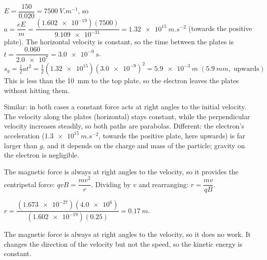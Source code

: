 \documentclass[12pt]{article}
\begin{document}
\ansq
{}
\begin{crit}
\end{crit}
\sample
$E = \dfrac{150}{0.020} = \qty{7500}{V.m^{-1}}$, so
$a = \dfrac{eE}{m} = \dfrac{(\num{1.602e-19})(7500)}{\num{9.109e-31}} = \qty{1.32e15}{m.s^{-2}}$ (towards the
positive plate). The horizontal velocity is constant, so the time between the plates is
$t = \dfrac{0.060}{\num{2.0e7}} = \qty{3.0e-9}{s}$.
\[ s_y = \tfrac{1}{2}at^2 = \tfrac{1}{2}(\num{1.32e15})(\num{3.0e-9})^2 = \qty{5.9e-3}{m} \;(\qty{5.9}{mm}, \text{ upwards}) \]
This is less than the \qty{10}{mm} to the top plate, so the electron leaves the plates without hitting
them.
\begin{crit}
\end{crit}
\sample
Similar: in both cases a constant force acts at right angles to the initial velocity. The velocity
along the plates (horizontal) stays constant, while the perpendicular velocity increases steadily, so
both paths are parabolas. Different: the electron's acceleration ($\qty{1.3e15}{m.s^{-2}}$, towards the
positive plate, here upwards) is far larger than $g$, and it depends on the charge and mass of the
particle; gravity on the electron is negligible.

\ansq
{}
\begin{crit}
\end{crit}
\sample
The magnetic force is always at right angles to the velocity, so it provides the centripetal force:
$qvB = \dfrac{mv^2}{r}$. Dividing by $v$ and rearranging: $r = \dfrac{mv}{qB}$.
\begin{crit}
\end{crit}
\sample
$r = \dfrac{(\num{1.673e-27})(\num{4.0e6})}{(\num{1.602e-19})(0.25)} = \qty{0.17}{m}$.
\begin{crit}
\end{crit}
\sample
The magnetic force is always at right angles to the velocity, so it does no work. It changes the
direction of the velocity but not the speed, so the kinetic energy is constant.
\end{document}
